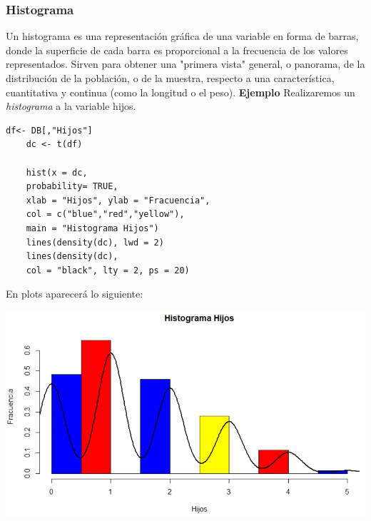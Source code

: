 \documentclass[12pt,hidelinks]{article}
\begin{document}
	\subsubsection{Histograma}
	Un histograma es una representación gráfica de una variable en forma de barras, donde la superficie de cada barra es proporcional a la frecuencia de los valores representados. Sirven para obtener una "primera vista" general, o panorama, de la distribución de la población, o de la muestra, respecto a una característica, cuantitativa y continua (como la longitud o el peso). \textbf{Ejemplo} Realizaremos un \textit{histograma} a la variable hijos.
	\begin{lstlisting}[frame=single]
	df<- DB[,"Hijos"]
	dc <- t(df)
	
	hist(x = dc,
	probability= TRUE,
	xlab = "Hijos", ylab = "Fracuencia",
	col = c("blue","red","yellow"),
	main = "Histograma Hijos")
	lines(density(dc), lwd = 2)
	lines(density(dc),
	col = "black", lty = 2, ps = 20)
	\end{lstlisting}
	En plots aparecerá lo siguiente:
	\begin{center}
		\includegraphics[width = 14cm]{images/2/GraficaHisto.PNG}
	\end{center}
\end{document}
